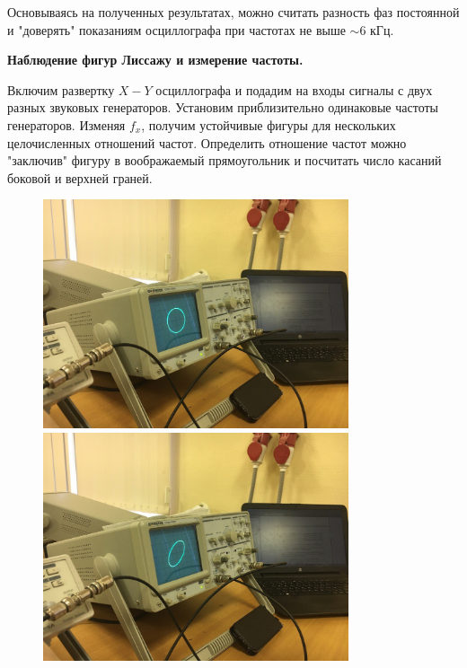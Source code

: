 \documentclass[14pt]{article}
\begin{document}
Основываясь на полученных результатах, можно считать разность фаз постоянной и "доверять" показаниям осциллографа при частотах не выше $\sim 6$ кГц.

\vspace{0.5cm}
\textbf{Наблюдение фигур Лиссажу и измерение частоты.}

Включим развертку $X-Y$ осциллографа и подадим на входы сигналы с двух разных звуковых генераторов. Установим приблизительно одинаковые частоты генераторов. Изменяя $f_x$, получим устойчивые фигуры для нескольких целочисленных отношений частот. Определить отношение частот можно "заключив" фигуру в воображаемый прямоугольник и посчитать число касаний боковой и верхней граней.


\newpage
\begin{figure}[h!]
	\includegraphics[width = 9cm]{lis_1_1}
	\includegraphics[width = 9cm]{lis_1_2}
	\label{fig:image}
\end{figure}
\end{document}
